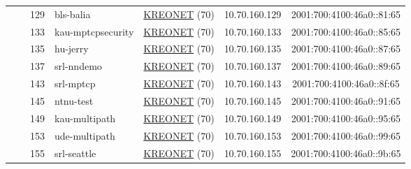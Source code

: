 \begin{small}
\begin{center}
\begin{longtable}{|c|c|c|c|c|c|c|c|}
  &  & \tiny{129} & \multicolumn{1}{|l|}{\tiny{bls-balia}} & \multicolumn{2}{|c|}{\tiny{\href{http://www.kreonet.net}{KREONET} (70)}} & \tiny{10.70.160.129} & \tiny{2001:700:4100:46a0::81:65} \\* \cline{3-3}\cline{4-4}\cline{5-5}\cline{6-6}\cline{7-7}\cline{8-8}
  &  & \tiny{133} & \multicolumn{1}{|l|}{\tiny{kau-mptcpsecurity}} & \multicolumn{2}{|c|}{\tiny{\href{http://www.kreonet.net}{KREONET} (70)}} & \tiny{10.70.160.133} & \tiny{2001:700:4100:46a0::85:65} \\* \cline{3-3}\cline{4-4}\cline{5-5}\cline{6-6}\cline{7-7}\cline{8-8}
  &  & \tiny{135} & \multicolumn{1}{|l|}{\tiny{hu-jerry}} & \multicolumn{2}{|c|}{\tiny{\href{http://www.kreonet.net}{KREONET} (70)}} & \tiny{10.70.160.135} & \tiny{2001:700:4100:46a0::87:65} \\* \cline{3-3}\cline{4-4}\cline{5-5}\cline{6-6}\cline{7-7}\cline{8-8}
  &  & \tiny{137} & \multicolumn{1}{|l|}{\tiny{srl-nndemo}} & \multicolumn{2}{|c|}{\tiny{\href{http://www.kreonet.net}{KREONET} (70)}} & \tiny{10.70.160.137} & \tiny{2001:700:4100:46a0::89:65} \\* \cline{3-3}\cline{4-4}\cline{5-5}\cline{6-6}\cline{7-7}\cline{8-8}
  &  & \tiny{143} & \multicolumn{1}{|l|}{\tiny{srl-mptcp}} & \multicolumn{2}{|c|}{\tiny{\href{http://www.kreonet.net}{KREONET} (70)}} & \tiny{10.70.160.143} & \tiny{2001:700:4100:46a0::8f:65} \\* \cline{3-3}\cline{4-4}\cline{5-5}\cline{6-6}\cline{7-7}\cline{8-8}
  &  & \tiny{145} & \multicolumn{1}{|l|}{\tiny{ntnu-test}} & \multicolumn{2}{|c|}{\tiny{\href{http://www.kreonet.net}{KREONET} (70)}} & \tiny{10.70.160.145} & \tiny{2001:700:4100:46a0::91:65} \\* \cline{3-3}\cline{4-4}\cline{5-5}\cline{6-6}\cline{7-7}\cline{8-8}
  &  & \tiny{149} & \multicolumn{1}{|l|}{\tiny{kau-multipath}} & \multicolumn{2}{|c|}{\tiny{\href{http://www.kreonet.net}{KREONET} (70)}} & \tiny{10.70.160.149} & \tiny{2001:700:4100:46a0::95:65} \\* \cline{3-3}\cline{4-4}\cline{5-5}\cline{6-6}\cline{7-7}\cline{8-8}
  &  & \tiny{153} & \multicolumn{1}{|l|}{\tiny{ude-multipath}} & \multicolumn{2}{|c|}{\tiny{\href{http://www.kreonet.net}{KREONET} (70)}} & \tiny{10.70.160.153} & \tiny{2001:700:4100:46a0::99:65} \\* \cline{3-3}\cline{4-4}\cline{5-5}\cline{6-6}\cline{7-7}\cline{8-8}
  &  & \tiny{155} & \multicolumn{1}{|l|}{\tiny{srl-seattle}} & \multicolumn{2}{|c|}{\tiny{\href{http://www.kreonet.net}{KREONET} (70)}} & \tiny{10.70.160.155} & \tiny{2001:700:4100:46a0::9b:65} \\* \cline{3-3}\cline{4-4}\cline{5-5}\cline{6-6}\cline{7-7}\cline{8-8}

\end{longtable}
\end{center}
\end{small}
